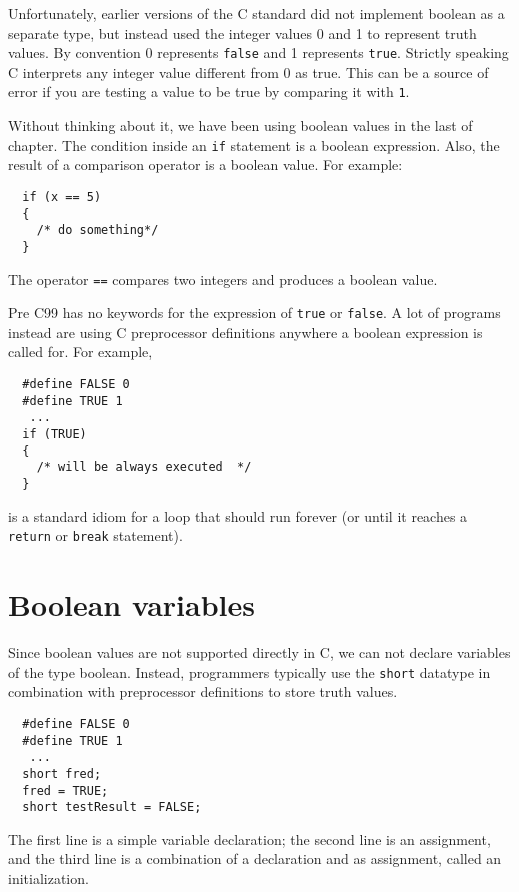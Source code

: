 Unfortunately, earlier versions of the C standard did not implement boolean as
a separate type, but instead used the integer values 0 and 1 to represent 
truth values. By convention 0 represents {\tt false} and 1 represents {\tt true}. 
Strictly speaking C interprets any integer value different from 0 as true. This
can be a source of error if you are testing a value to be true by comparing it with {\tt 1}.

%

Without thinking about it, we have been using boolean values in the
last of chapter.  The condition inside an {\tt if}
statement is a boolean expression.
Also, the result of a comparison operator is a boolean value.
For example:

\begin{verbatim}
  if (x == 5) 
  {
    /* do something*/
  }
\end{verbatim}
%
The operator {\tt ==} compares two integers and produces a
boolean value.


Pre C99 has no keywords for the expression of {\tt true} or {\tt false}.
A lot of programs instead are
using C preprocessor definitions anywhere a boolean expression is called for.
For example, 

\begin{verbatim}
  #define FALSE 0
  #define TRUE 1
   ...
  if (TRUE) 
  {
    /* will be always executed  */
  }
\end{verbatim}
%
is a standard idiom for a loop that should run forever (or
until it reaches a {\tt return} or {\tt break} statement).

\section{Boolean variables}

Since boolean values are not supported directly in C, we can not declare
variables of the type boolean. 
Instead, programmers typically use the {\tt short} datatype in combination with 
preprocessor definitions to store truth values.

\begin{verbatim}
  #define FALSE 0
  #define TRUE 1
   ...
  short fred;
  fred = TRUE;
  short testResult = FALSE;
\end{verbatim}
%
The first line is a simple variable declaration;
the second line is an assignment, and the third line is a
combination of a declaration and as assignment, 
called an initialization.

